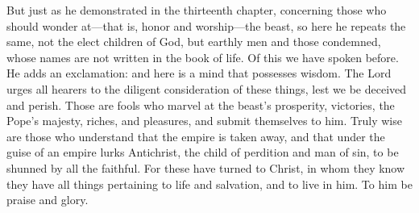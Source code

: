But just as he demonstrated in the thirteenth chapter, concerning those who should wonder at—that is, honor and worship—the beast, so here he repeats the same, not the elect children of God, but earthly men and those condemned, whose names are not written in the book of life. Of this we have spoken before. He adds an exclamation: and here is a mind that possesses wisdom. The Lord urges all hearers to the diligent consideration of these things, lest we be deceived and perish. Those are fools who marvel at the beast’s prosperity, victories, the Pope’s majesty, riches, and pleasures, and submit themselves to him. Truly wise are those who understand that the empire is taken away, and that under the guise of an empire lurks Antichrist, the child of perdition and man of sin, to be shunned by all the faithful. For these have turned to Christ, in whom they know they have all things pertaining to life and salvation, and to live in him. To him be praise and glory.
